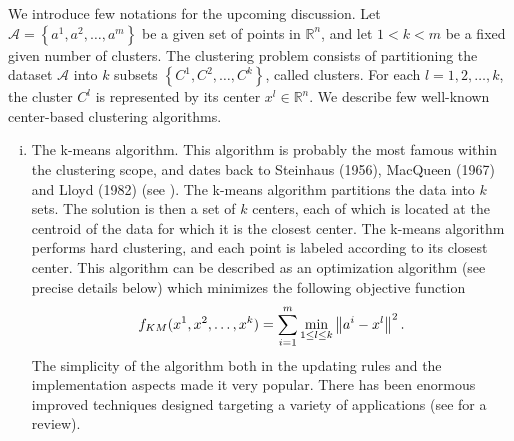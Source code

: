 We introduce few notations for the upcoming discussion. Let $\mathcal{A}= \left\lbrace a^1, a^2, \ldots ,a^m \right\rbrace$ be a given set of points in $\mathbb{R}^n$, and let $1 < k < m$ be a fixed given number of clusters. The clustering problem consists of partitioning the dataset $\mathcal{A}$ into $k$ subsets $\left\lbrace C^1, C^2, \ldots ,C^k \right\rbrace$, called clusters. For each $l=1, 2, \ldots ,k$, the cluster $C^l$ is represented by its center $x^l \in \mathbb{R}^n$. We describe few well-known center-based clustering algorithms.
\begin{enumerate}[(i)]
	\item The k-means algorithm. This algorithm is probably the most famous within the clustering scope, and dates back to Steinhaus (1956), MacQueen (1967) and Lloyd (1982) (see \cite{S1956,M1967,L1982}). The k-means algorithm partitions the data into $k$ sets. The solution is then a set of $k$ centers, each of which is located at the centroid of the data for which it is the closest center. The k-means algorithm performs hard clustering, and each point is labeled according to its closest center. This algorithm can be described as an optimization algorithm (see precise details below) which minimizes the following objective function
	\begin{equation*}
		f_{KM}(x^1,x^2,\ldots,x^k) = \sum\limits_{i=1}^{m}\min\limits_{1 \le l \le k} \left\Vert {a^i-x^l} \right\Vert^2.
	\end{equation*}
	The simplicity of the algorithm both in the updating rules and the implementation aspects made it very popular. There has been enormous improved techniques designed targeting a variety of applications (see \cite{JMF1999} for a review).
	

\end{enumerate}

